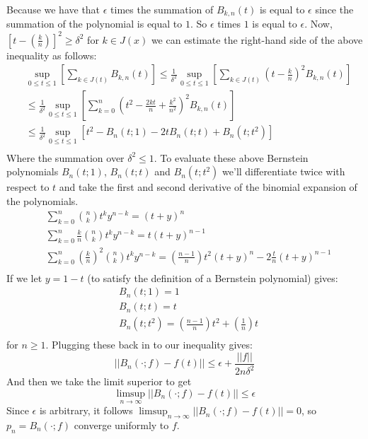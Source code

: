 \documentclass{article}
\begin{document}
Because we have that $\epsilon$ times the summation of $B_{k,n}(t)$ is equal to $\epsilon$ since the summation of the polynomial is equal to $1$.
So $\epsilon$ times $1$ is equal to $\epsilon$.
Now, $\left[ t-\left( \frac{k}{n} \right) \right]^2 \geq \delta^2$ for $k\in J(x)$ we can estimate the right-hand side of the above inequality as follows:
\begin{align*}
&\sup_{0\leq t\leq 1}\left[\sum_{k\in J(t)}B_{k,n}(t)\right]\leq\frac{1}{\delta^2}\sup_{0\leq t\leq 1}\left[\sum_{k\in J(t)}\left(t-\frac{k}{n}\right)^2 B_{k,n}(t)\right]\\
&\leq\frac{1}{\delta^2}\sup_{0\leq t\leq 1}\left[\sum_{k=0}^n\left(t^2-\frac{2kt}{n}+\frac{k^2}{n^2}\right)^2 B_{k,n}(t)\right]\\
&\leq\frac{1}{\delta^2}\sup_{0\leq t\leq 1}\left[t^2-B_n(t;1)-2tB_n(t;t)+B_n(t;t^2)\right]\\
\end{align*}
Where the summation over $\delta^2\leq1$. To evaluate these above Bernstein polynomials $B_n(t;1)$, $B_n(t;t)$ and $B_n(t;t^2)$ we’ll differentiate twice with respect to $t$ and take the first and second derivative of the binomial expansion of the polynomials.
\begin{align*}
&\sum_{k=0}^n\binom{n}{k}t^ky^{n-k}=(t+y)^n\\
&\sum_{k=0}^n\frac{k}{n}\binom{n}{k}t^ky^{n-k}=t(t+y)^{n-1}\\
&\sum_{k=0}^n\left(\frac{k}{n}\right)^2\binom{n}{k}t^ky^{n-k}=\left(\frac{n-1}{n}\right)t^2(t+y)^n-2\frac{t}{n}(t+y)^{n-1}\\
\end{align*}
If we let $y=1-t$ (to satisfy the definition of a Bernstein polynomial) gives:
\begin{align*}
&B_n(t;1)=1\\
&B_n(t;t)=t\\
&B_n(t;t^2)=\left(\frac{n-1}{n}\right)t^2+\left(\frac{1}{n}\right)t\\
\end{align*}
for $n\geq1$. Plugging these back in to our inequality gives:
\begin{equation}
||B_n(\cdot;f)-f(t)||\leq\epsilon+\frac{||f||}{2n\delta^2}    
\end{equation}
And then we take the limit superior to get
\begin{equation}
\limsup_{n\rightarrow{\infty}}||B_n(\cdot;f)-f(t)||\leq\epsilon    
\end{equation}
Since $\epsilon$ is arbitrary, it follows $\limsup_{n\rightarrow{\infty}}||B_n(\cdot;f)-f(t)|| = 0$, so $p_n = B_n(\cdot;f)$ converge uniformly to $f$.
\end{document}
